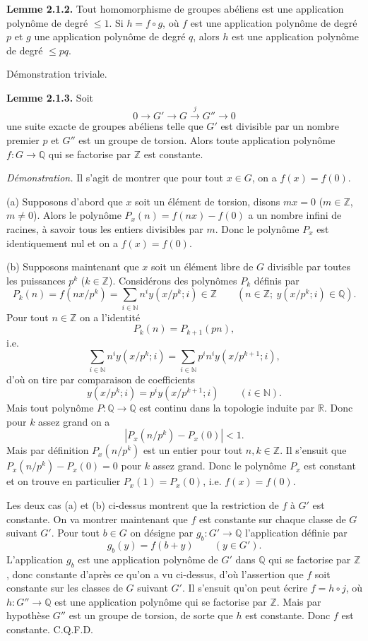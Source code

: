 \documentclass[11pt]{article}
\begin{document}
\textbf{Lemme 2.1.2.} Tout homomorphisme de groupes abéliens est une application polynôme de degré $\leq1$. Si $h=f\circ g$, où $f$ est une application polynôme de degré $p$ et $g$ une application polynôme de degré $q$, alors $h$ est une application polynôme de degré $\leq pq$.

Démonstration triviale.

\textbf{Lemme 2.1.3.} Soit
\[
0\longrightarrow G'\longrightarrow G\xrightarrow{j}G''\longrightarrow0
\]
une suite exacte de groupes abéliens telle que $G'$ est divisible par un nombre premier $p$ et $G''$ est un groupe de torsion. Alors toute application polynôme $f:G\to\mathbb Q$ qui se factorise par $\mathbb Z$ est constante.

\emph{Démonstration.} Il s'agit de montrer que pour tout $x\in G$, on a $f(x)=f(0)$.

(a) Supposons d'abord que $x$ soit un élément de torsion, disons $mx=0$ ($m\in\mathbb Z$, $m\ne0$). Alors le polynôme $P_x(n)=f(nx)-f(0)$ a un nombre infini de racines, à savoir tous les entiers divisibles par $m$. Donc le polynôme $P_x$ est identiquement nul et on a $f(x)=f(0)$.

(b) Supposons maintenant que $x$ soit un élément libre de $G$ divisible par toutes les puissances $p^k$ ($k\in\mathbb Z$). Considérons des polynômes $P_k$ définis par
\[
P_k(n)=f(nx/p^k)=\sum_{i\in\mathbb N}n^iy(x/p^k;i)\in\mathbb Z
\qquad(n\in\mathbb Z;\ y(x/p^k;i)\in\mathbb Q).
\]
Pour tout $n\in\mathbb Z$ on a l'identité
\[
P_k(n)=P_{k+1}(pn),
\]
i.e.
\[
\sum_{i\in\mathbb N}n^iy(x/p^k;i)=\sum_{i\in\mathbb N}p^in^iy(x/p^{k+1};i),
\]
d'où on tire par comparaison de coefficients
\[
y(x/p^k;i)=p^iy(x/p^{k+1};i)\qquad(i\in\mathbb N).
\]
Mais tout polynôme $P:\mathbb Q\to\mathbb Q$ est continu dans la topologie induite par $\mathbb R$. Donc pour $k$ assez grand on a
\[
|P_x(n/p^k)-P_x(0)|<1.
\]
Mais par définition $P_x(n/p^k)$ est un entier pour tout $n,k\in\mathbb Z$. Il s'ensuit que $P_x(n/p^k)-P_x(0)=0$ pour $k$ assez grand. Donc le polynôme $P_x$ est constant et on trouve en particulier $P_x(1)=P_x(0)$, i.e. $f(x)=f(0)$.

Les deux cas (a) et (b) ci-dessus montrent que la restriction de $f$ à $G'$ est constante. On va montrer maintenant que $f$ est constante sur chaque classe de $G$ suivant $G'$. Pour tout $b\in G$ on désigne par $g_b:G'\to\mathbb Q$ l'application définie par
\[
g_b(y)=f(b+y)\qquad(y\in G').
\]
L'application $g_b$ est une application polynôme de $G'$ dans $\mathbb Q$ qui se factorise par $\mathbb Z$, donc constante d'après ce qu'on a vu ci-dessus, d'où l'assertion que $f$ soit constante sur les classes de $G$ suivant $G'$. Il s'ensuit qu'on peut écrire $f=h\circ j$, où $h:G''\to\mathbb Q$ est une application polynôme qui se factorise par $\mathbb Z$. Mais par hypothèse $G''$ est un groupe de torsion, de sorte que $h$ est constante. Donc $f$ est constante. C.Q.F.D.
\end{document}

